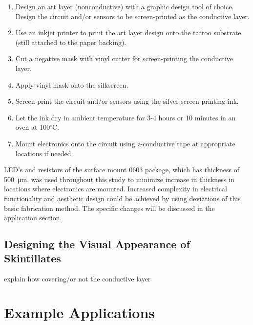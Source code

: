 \documentclass{sigchi}
\begin{document}
\begin{enumerate}
  \item Design an art layer (nonconductive) %
   with a graphic design tool of choice. Design the circuit and/or sensors to be screen-printed as the conductive layer.
  \item Use an inkjet printer to print the art layer design onto the tattoo substrate (still attached to the paper backing). 
  \item Cut a negative mask with vinyl cutter for screen-printing the conductive layer. 
  \item Apply vinyl mask onto the silkscreen. 
  \item Screen-print the circuit and/or sensors using the silver screen-printing ink.
  \item Let the ink dry in ambient temperature for 3-4 hours or 10 minutes in an oven at 100$^{\circ}$C. 
  \item Mount electronics onto the circuit using z-conductive tape at appropriate locations if needed.   
\end{enumerate}
LED's and resistors of the surface mount 0603 package, which has thickness of  \SI{500}{\micro\metre}, was used throughout this study to minimize increase in thickness in locations where electronics are mounted. Increased complexity in electrical functionality and aesthetic design could be achieved by using deviations of this basic fabrication method. The specific changes will be discussed in the application section. 

\subsection{Designing the Visual Appearance of Skintillates}
explain how covering/or not the conductive layer

\section{Example Applications}
\end{document}
